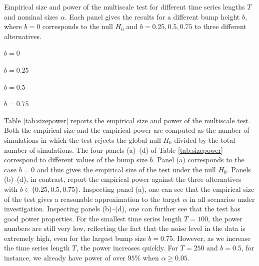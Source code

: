 \documentclass[12pt]{article}
\begin{document}
\begin{table}[t!]
\renewcommand{\arraystretch}{1.2}  
\footnotesize{
\begin{center}
\caption{Empirical size and power of the multiscale test for different time series lengths $T$ and nominal sizes $\alpha$.
Each panel gives the results for a different bump height $b$, where $b = 0$ corresponds to the null $H_0$ and $b = 0.25,0.5,0.75$ to three different alternatives.}\label{tab:sizepower}
\begin{subtable}[b]{0.4\textwidth}
\centering  
\caption{$b=0$}

\end{subtable}
\begin{subtable}[b]{0.4\textwidth}
\centering  
\caption{$b=0.25$}

\end{subtable}
\begin{subtable}[b]{0.4\textwidth}
\centering  
\vspace{0.25cm} \caption{$b=0.5$}

\end{subtable}
\begin{subtable}[b]{0.4\textwidth}
\centering  
\vspace{0.25cm} \caption{$b=0.75$}

\end{subtable}
\end{center}}
\end{table}


Table \ref{tab:sizepower} reports the empirical size and power of the multiscale test. Both the empirical size and the empirical power are computed as the number of simulations in which the test rejects the global null $H_0$ divided by the total number of simulations.
The four panels (a)--(d) of Table \ref{tab:sizepower} correspond to different values of the bump size $b$. Panel (a) corresponds to the case $b=0$ and thus gives the empirical size of the test under the null $H_0$. Panels (b)--(d), in contrast, report the empirical power against the three alternatives with $b \in \{0.25,0.5,0.75\}$.
Inspecting panel (a), one can see that the empirical size of the test gives a reasonable approximation to the target $\alpha$ in all scenarios under investigation.
Inspecting panels (b)--(d), one can further see that the test has good power properties. For the smallest time series length $T=100$, the power numbers are still very low, reflecting the fact that the noise level in the data is extremely high, even for the largest bump size $b=0.75$. 
However, as we increase the time series length $T$, the power increases quickly. For $T=250$ and $b=0.5$, for instance, we already have power of over $95\%$ when $\alpha \ge 0.05$.
\end{document}
